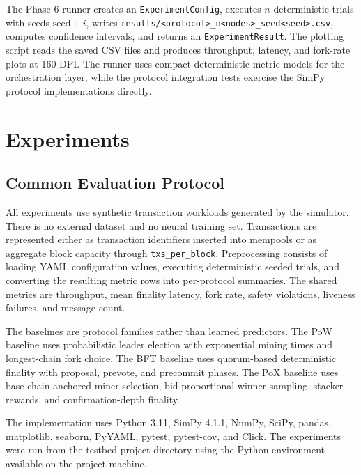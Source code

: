 \documentclass[11pt]{article}
\begin{document}
The Phase 6 runner creates an \texttt{ExperimentConfig}, executes $n$ deterministic trials with seeds $\mathrm{seed}+i$, writes \texttt{results/<protocol>\_n<nodes>\_seed<seed>.csv}, computes confidence intervals, and returns an \texttt{ExperimentResult}. The plotting script reads the saved CSV files and produces throughput, latency, and fork-rate plots at 160 DPI. The runner uses compact deterministic metric models for the orchestration layer, while the protocol integration tests exercise the SimPy protocol implementations directly.

\section{Experiments}

\subsection{Common Evaluation Protocol}

All experiments use synthetic transaction workloads generated by the simulator. There is no external dataset and no neural training set. Transactions are represented either as transaction identifiers inserted into mempools or as aggregate block capacity through \texttt{txs\_per\_block}. Preprocessing consists of loading YAML configuration values, executing deterministic seeded trials, and converting the resulting metric rows into per-protocol summaries. The shared metrics are throughput, mean finality latency, fork rate, safety violations, liveness failures, and message count.

The baselines are protocol families rather than learned predictors. The PoW baseline uses probabilistic leader election with exponential mining times and longest-chain fork choice. The BFT baseline uses quorum-based deterministic finality with proposal, prevote, and precommit phases. The PoX baseline uses base-chain-anchored miner selection, bid-proportional winner sampling, stacker rewards, and confirmation-depth finality.

The implementation uses Python 3.11, SimPy 4.1.1, NumPy, SciPy, pandas, matplotlib, seaborn, PyYAML, pytest, pytest-cov, and Click. The experiments were run from the testbed project directory using the Python environment available on the project machine.
\end{document}
